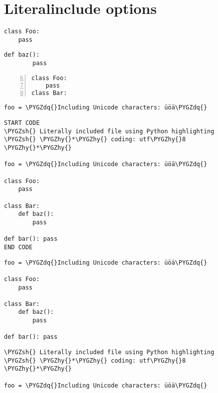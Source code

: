 \documentclass[letterpaper,10pt,english]{sphinxmanual}
\def\PYGZsh{\char`\#}
\def\PYGZhy{\char`\-}
\def\PYGZdq{\char`\"}
\begin{document}
\chapter{Literalinclude options}
\label{includes:literalinclude-options}
\begin{Verbatim}[commandchars=\\\{\}]
class Foo:
    pass
\end{Verbatim}

\begin{Verbatim}[commandchars=\\\{\}]
    def baz():
        pass
\end{Verbatim}

\begin{Verbatim}[commandchars=\\\{\},numbers=left,firstnumber=6,stepnumber=1]
class Foo:
    pass
class Bar:
\end{Verbatim}

\begin{Verbatim}[commandchars=\\\{\}]
foo = \PYGZdq{}Including Unicode characters: üöä\PYGZdq{}
\end{Verbatim}

\begin{Verbatim}[commandchars=\\\{\}]
START CODE
\PYGZsh{} Literally included file using Python highlighting
\PYGZsh{} \PYGZhy{}*\PYGZhy{} coding: utf\PYGZhy{}8 \PYGZhy{}*\PYGZhy{}

foo = \PYGZdq{}Including Unicode characters: üöä\PYGZdq{}

class Foo:
    pass

class Bar:
    def baz():
        pass

def bar(): pass
END CODE
\end{Verbatim}

\begin{Verbatim}[commandchars=\\\{\}]
foo = \PYGZdq{}Including Unicode characters: üöä\PYGZdq{}

class Foo:
    pass

class Bar:
    def baz():
        pass

def bar(): pass
\end{Verbatim}

\begin{Verbatim}[commandchars=\\\{\}]
\PYGZsh{} Literally included file using Python highlighting
\PYGZsh{} \PYGZhy{}*\PYGZhy{} coding: utf\PYGZhy{}8 \PYGZhy{}*\PYGZhy{}

foo = \PYGZdq{}Including Unicode characters: üöä\PYGZdq{}
\end{Verbatim}
\end{document}
